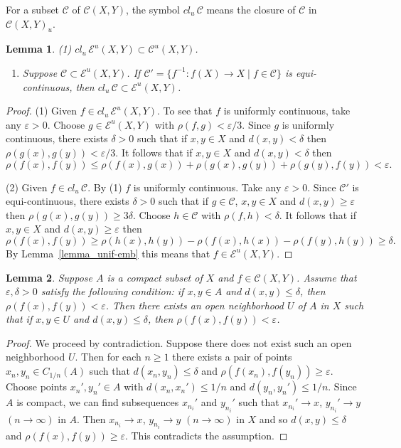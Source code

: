 \documentclass[11pt, fleqn]{amsart}
\newtheorem{lemma}{Lemma}[section]
\theoremstyle{definition}
\newcommand{\cal}{\mathcal}
\newcommand{\e}{\varepsilon}
\newcommand{\E}{\mathcal E}
\begin{document}
For a subset ${\cal C}$ of ${\cal C}(X, Y)$, the symbol 
$cl_u\,{\cal C}$ means the closure of ${\cal C}$ in ${\cal C}(X, Y)_u$. 



\begin{lemma}\label{lemma_equi-conti} 
{\rm (1)} $cl_u\,\E^u(X, Y) \subset {\cal C}^u(X, Y)$. 
\begin{enumerate}
\item[(2)] Suppose ${\cal C} \subset \E^u(X, Y)$.  
If ${\cal C}' = \{ f^{-1} : f(X) \to X \mid f \in {\cal C} \}$ is equi-continuous, then $cl_u\,{\cal C} \subset \E^u(X, Y)$. 
\end{enumerate}
\end{lemma} 

\begin{proof} (1) Given $f \in cl_u\,\E^u(X, Y)$. To see that $f$ is uniformly continuous, take any $\e > 0$. 
Choose $g \in \E^u(X, Y)$ with $\rho(f,g) < \e/3$. 
Since $g$ is uniformly continuous, there exists $\delta > 0$ such that 
if $x,y \in X$ and $d(x,y) < \delta$ then $\rho(g(x), g(y)) < \e/3$. 
It follows that if $x,y \in X$ and $d(x,y) < \delta$ then
$$\rho(f(x), f(y)) \leq \rho(f(x), g(x)) + \rho(g(x), g(y)) + \rho(g(y), f(y)) < \e.$$ 

(2) Given $f \in cl_u\,{\cal C}$. By (1) $f$ is uniformly continuous. Take any $\e > 0$. 
Since ${\cal C}'$ is equi-continuous, there exists $\delta > 0$ such that 
if $g \in {\cal C}$, $x, y \in X$ and $d(x,y) \geq \e$ then $\rho(g(x), g(y)) \geq 3\delta$. 
Choose $h \in {\cal C}$ with $\rho(f, h) < \delta$. 
It follows that if $x, y \in X$ and $d(x,y) \geq \e$ then 
$$\rho(f(x), f(y)) \geq \rho(h(x), h(y)) - \rho(f(x), h(x)) - \rho(f(y), h(y)) \geq \delta.$$ 
By Lemma~\ref{lemma_unif-emb} this means that $f \in \E^u(X, Y)$. 
\end{proof} 

\begin{lemma}\label{lemma_unif_nbd}
Suppose $A$ is a compact subset of $X$ and $f \in {\cal C}(X, Y)$.
Assume that $\e, \delta >0$ satisfy the following condition: if $x,y \in A$ and $d(x,y) \leq \delta$, then $\rho(f(x), f(y)) < \e$. 
Then there exists an open neighborhood $U$ of $A$ in $X$ such that if $x,y \in U$ and $d(x,y) \leq \delta$, then $\rho(f(x), f(y)) < \e$.
\end{lemma} 

\begin{proof} We proceed by contradiction. Suppose there does not exist such an open neighborhood $U$. 
Then for each $n \geq 1$ there exists a pair of points $x_n, y_n \in C_{1/n}(A)$ such that $d(x_n, y_n) \leq \delta$ and $\rho(f(x_n), f(y_n)) \geq \e$. 
Choose points $x_n', y_n' \in A$ with $d(x_n, x_n') \leq 1/n$ and $d(y_n, y_n') \leq 1/n$. 
Since $A$ is compact, we can find subsequences $x_{n_i}'$ and $y_{n_i}'$ such that $x_{n_i}' \to x$, $y_{n_i}' \to y$ $(n \to \infty)$ in $A$. 
Then $x_{n_i} \to x$, $y_{n_i} \to y$ $(n \to \infty)$ in $X$ and so $d(x,y) \leq \delta$ and $\rho(f(x), f(y)) \geq \e$. 
This contradicts the assumption. 
\end{proof} 
\end{document}
